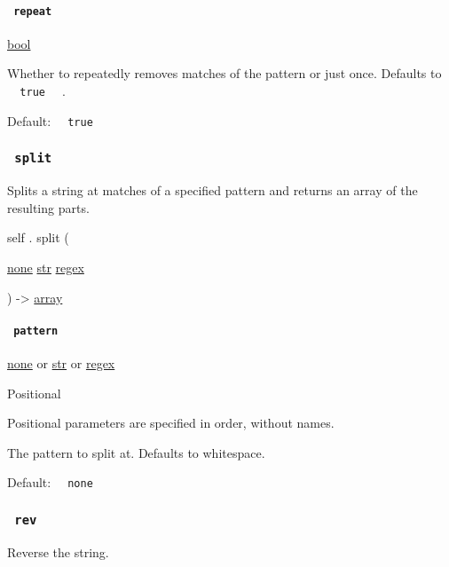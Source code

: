 \paragraph{\texorpdfstring{\texttt{\ repeat\ }}{ repeat }}\label{definitions-trim-repeat}

\href{/docs/reference/foundations/bool/}{bool}

Whether to repeatedly removes matches of the pattern or just once.
Defaults to \texttt{\ }{\texttt{\ true\ }}\texttt{\ } .

Default: \texttt{\ }{\texttt{\ true\ }}\texttt{\ }

\subsubsection{\texorpdfstring{\texttt{\ split\ }}{ split }}\label{definitions-split}

Splits a string at matches of a specified pattern and returns an array
of the resulting parts.

self { . } { split } (

{ \href{/docs/reference/foundations/none/}{none}
\href{/docs/reference/foundations/str/}{str}
\href{/docs/reference/foundations/regex/}{regex} }

) -\textgreater{} \href{/docs/reference/foundations/array/}{array}

\paragraph{\texorpdfstring{\texttt{\ pattern\ }}{ pattern }}\label{definitions-split-pattern}

\href{/docs/reference/foundations/none/}{none} {or}
\href{/docs/reference/foundations/str/}{str} {or}
\href{/docs/reference/foundations/regex/}{regex}

{{ Positional }}

\label{definitions-split-pattern-positional-tooltip}
Positional parameters are specified in order, without names.

The pattern to split at. Defaults to whitespace.

Default: \texttt{\ }{\texttt{\ none\ }}\texttt{\ }

\subsubsection{\texorpdfstring{\texttt{\ rev\ }}{ rev }}\label{definitions-rev}

Reverse the string.

